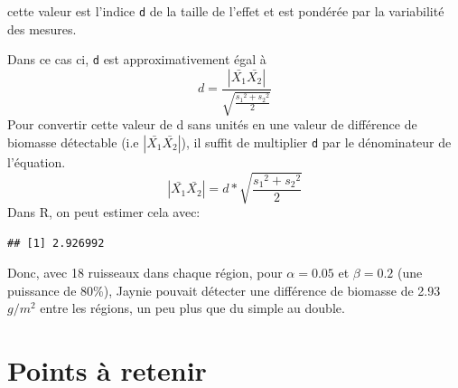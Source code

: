 \documentclass[
  12pt,
]{book}
\makeatletter
\newenvironment{Shaded}{\begin{snugshade}}{\end{snugshade}}
\newcommand{\DataTypeTok}[1]{\textcolor[rgb]{0.13,0.29,0.53}{#1}}
\newcommand{\DecValTok}[1]{\textcolor[rgb]{0.00,0.00,0.81}{#1}}
\newcommand{\FloatTok}[1]{\textcolor[rgb]{0.00,0.00,0.81}{#1}}
\newcommand{\KeywordTok}[1]{\textcolor[rgb]{0.13,0.29,0.53}{\textbf{#1}}}
\newcommand{\NormalTok}[1]{#1}
\newcommand{\OperatorTok}[1]{\textcolor[rgb]{0.81,0.36,0.00}{\textbf{#1}}}
\newcommand{\StringTok}[1]{\textcolor[rgb]{0.31,0.60,0.02}{#1}}
\newenvironment{kframe}{%
\medskip{}
\setlength{\fboxsep}{.8em}
\def\at@end@of@kframe{}%
\ifinner\ifhmode%
 \def\at@end@of@kframe{\end{minipage}}%
 \begin{minipage}{\columnwidth}%
\fi\fi%
\def\FrameCommand##1{\hskip\@totalleftmargin \hskip-\fboxsep
\colorbox{incolor}{##1}\hskip-\fboxsep
    \hskip-\linewidth \hskip-\@totalleftmargin \hskip\columnwidth}%
\MakeFramed {\advance\hsize-\width
  \@totalleftmargin\z@ \linewidth\hsize
  \@setminipage}}%
{\par\unskip\endMakeFramed%
\at@end@of@kframe}
\newenvironment{rmdblock}[1]
 {
 \begin{itemize}
 \renewcommand{\labelitemi}{
   \raisebox{-.7\height}[0pt][0pt]{
     {\setkeys{Gin}{width=3em,keepaspectratio}\texttt{[image: images/\#1]}}
   }
 }
 \begin{kframe}
 \setlength{\fboxsep}{1em}
 \item
 }
 {
 \end{kframe}
 \end{itemize}
 }
\newenvironment{rmdcaution}
  {\begin{rmdblock}{caution}}
  {\end{rmdblock}}
\makeatother
\begin{document}
\begin{rmdcaution}
cette valeur est l'indice \texttt{d} de la taille de l'effet et est pondérée par la variabilité des mesures.
\end{rmdcaution}

Dans ce cas ci, \texttt{d} est approximativement égal à
\[ d = \frac{| \bar{X_1} \bar{X_2} |} {\sqrt{\frac{{s_1}^2 +{s_2}^2}{2}}}\]
Pour convertir cette valeur de d sans unités en une valeur de différence de biomasse détectable (i.e \(| \bar{X_1} \bar{X_2} |\)), il suffit de multiplier \texttt{d} par le dénominateur de l'équation.
\[
| \bar{X_1} \bar{X_2} | = d * \sqrt{\frac{{s_1}^2 +{s_2}^2}{2}}
\]
Dans R, on peut estimer cela avec:

\begin{Shaded}
\end{Shaded}

\begin{verbatim}
## [1] 2.926992
\end{verbatim}

Donc, avec 18 ruisseaux dans chaque région, pour \(\alpha=0.05\) et \(\beta=0.2\) (une puissance de 80\%), Jaynie pouvait détecter une différence de biomasse de 2.93\(g/m^2\) entre les régions, un peu plus que du simple au double.

\hypertarget{points-uxe0-retenir}{%
\section{Points à retenir}\label{points-uxe0-retenir}}
\end{document}

